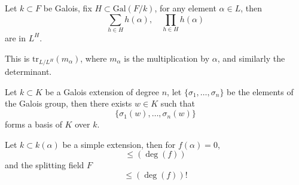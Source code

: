 \documentclass[openany]{book}
\newcommand{\tr}{\text{tr}}
\newcommand{\gal}{\text{Gal}}
\begin{document}
\begin{prop}
    Let $k\subset F$ be Galois, fix $H\subset\gal(F/k)$, for any element $\alpha\in L$, then 
    \begin{equation*}
        \sum_{h\in H}h(\alpha), \quad \prod_{h\in H}h(\alpha)
    \end{equation*}
    are in $L^H$. 
\end{prop}
This is $\tr_{L/L^H}(m_\alpha)$, where $m_\alpha$ is the multiplication by $\alpha$, and similarly the determinant.








\begin{prop}
    Let $k\subset K$ be a Galois extension of degree $n$, let $\{\sigma_1,\dots,\sigma_n\}$ be the elements of the Galois group, then there exists $w\in K$ such that 
    \begin{equation*}
        \{\sigma_1(w),\dots, \sigma_n(w)\}
    \end{equation*}
    forms a basis of $K$ over $k$.
\end{prop}





\begin{prop}
    Let $k\subset k(\alpha)$ be a simple  extension, then for $f(\alpha)=0$, 
    \begin{equation*}
        [k(\alpha):k]\leq (\deg(f))
    \end{equation*}
    and the splitting field $F$ 
    \begin{equation*}
        [F:k]\leq (\deg(f))!
    \end{equation*}
\end{prop}
\end{document}
